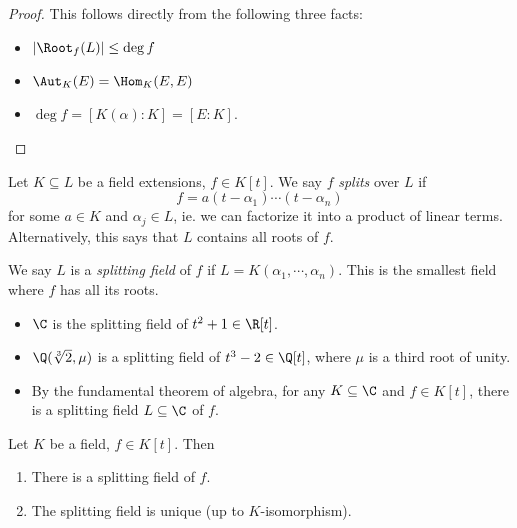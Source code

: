 \documentclass[a4paper]{article}
\begin{document}
\begin{proof}
  This follows directly from the following three facts:
  \begin{itemize}
    \item $|\Root_f(L)| \leq \deg f$
    \item $\Aut_K(E) = \Hom_K(E, E)$
    \item $\deg f = [K(\alpha): K] = [E:K]$.
  \end{itemize}
\end{proof}

\begin{defi}
  Let $K\subseteq L$ be a field extensions, $f\in K[t]$. We say $f$ \emph{splits} over $L$ if
  \[
    f = a(t - \alpha_1)\cdots (t - \alpha_n)
  \]
  for some $a \in K$ and $\alpha_j \in L$, ie. we can factorize it into a product of linear terms. Alternatively, this says that $L$ contains all roots of $f$.

  We say $L$ is a \emph{splitting field} of $f$ if $L = K(\alpha_1, \cdots, \alpha_n)$. This is the smallest field where $f$ has all its roots.
\end{defi}

\begin{eg}\leavevmode
  \begin{itemize}
    \item $\C$ is the splitting field of $t^2 + 1 \in \R[t]$.
    \item $\Q(\sqrt[3]{2}, \mu)$ is a splitting field of $t^3 - 2 \in \Q[t]$, where $\mu$ is a third root of unity.
    \item By the fundamental theorem of algebra, for any $K\subseteq \C$ and $f\in K[t]$, there is a splitting field $L\subseteq \C$ of $f$.
  \end{itemize}
\end{eg}

\begin{thm}
  Let $K$ be a field, $f\in K[t]$. Then
  \begin{enumerate}
    \item There is a splitting field of $f$.
    \item The splitting field is unique (up to $K$-isomorphism).
  \end{enumerate}
\end{thm}
\end{document}
